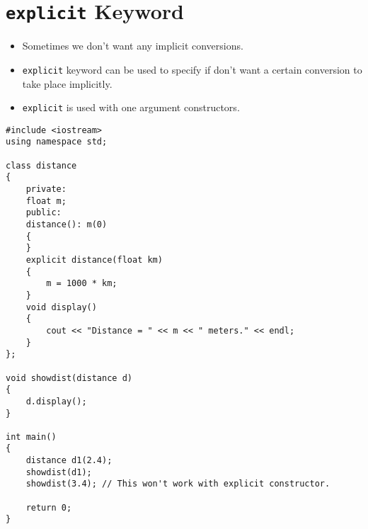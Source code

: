 \documentclass[12pt,a4paper]{article}
\begin{document}
\section{\texttt{explicit} Keyword}
\begin{itemize}
\item Sometimes we don't want any implicit conversions.
\item \verb|explicit| keyword can be used to specify if don't want a certain conversion to take place implicitly.
\item \verb|explicit| is used with one argument constructors.
\end{itemize}
\begin{lstlisting}[caption={\texttt{explicit} constructor with distance class}]
#include <iostream>
using namespace std;

class distance
{
	private:
	float m;
	public:
	distance(): m(0)
	{
	}
	explicit distance(float km)
	{
		m = 1000 * km;
	}
	void display()
	{
		cout << "Distance = " << m << " meters." << endl;
	}
};

void showdist(distance d)
{
	d.display();
}

int main()
{
	distance d1(2.4);
	showdist(d1);
	showdist(3.4); // This won't work with explicit constructor.

	return 0;
}
\end{lstlisting}


\end{document}
